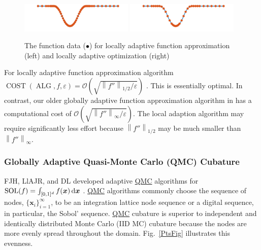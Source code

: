 \documentclass[11pt]{NSFamsart}
\newcommand{\QMC}{\hyperlink{QMClink}{QMC}\xspace}
\DeclareMathOperator{\cost}{COST}
\DeclareMathOperator{\SOL}{SOL}
\DeclareMathOperator{\ALG}{ALG}
\newcommand{\bx}{{\boldsymbol{x}}}
\def\dif{\textup{d}}
\newcommand{\norm}[2][{}]{\ensuremath{\left \lVert #2 \right \rVert}_{#1}}
\newcommand{\Order}{\mathcal{O}}
\begin{document}
\begin{figure}[h]
	\centering
	\vspace{-1ex}
	\includegraphics[width = 0.48\textwidth]{ProgramsImages/sampling-funappxg.png}
	\includegraphics[width = 0.48\textwidth]{ProgramsImages/sampling-funming.png}
	
	\vspace{-2ex}
	\caption{The function data ({\color{MATLABOrange}$\bullet$}) for  locally adaptive 
	function approximation  (left) and locally adaptive optimization (right) \label{localadaptfig}}
\end{figure}


For locally adaptive function approximation algorithm 
$\cost(\ALG,f,\varepsilon) = \Order\left(\sqrt{\norm[1/2]{f''}/\varepsilon} \right)$ \cite{ChoEtal17a}.  This is essentially optimal. In contrast, 
our older globally adaptive function approximation algorithm in \cite{HicEtal14b} has a 
computational cost of $\Order\left(\sqrt{\norm[\infty]{f''}/\varepsilon} \right)$.  The local adaption algorithm may require significantly less effort because $\norm[1/2]{f''}$ may be much smaller than 
$\norm[\infty]{f''}$.

\subsubsection[QMCsec]{Globally  Adaptive Quasi-Monte Carlo (QMC) 
Cubature} \hypertarget{QMClink}{}
\label{sec:QMC}
FJH, LlAJR, and DL 
developed adaptive \QMC algorithms for $\SOL(f) = \int_{[0,1]^d} f(\bx) \, \dif \bx$  \cite{HicJim16a,JimHic16a}.  \QMC algorithms \cite{DicEtal14a} commonly 
choose the 
sequence of nodes, $\{\bx_i\}_{i=1}^\infty$, to be an integration lattice node sequence  or a digital
sequence, in particular, the Sobol' sequence.  \QMC cubature is superior to 
independent and identically distributed Monte Carlo (\hypertarget{IIDMClink}{IID MC}) cubature 
because the nodes are more 
evenly spread throughout the domain.   Fig.\ \ref{PtsFig} illustrates this evenness.
\end{document}
